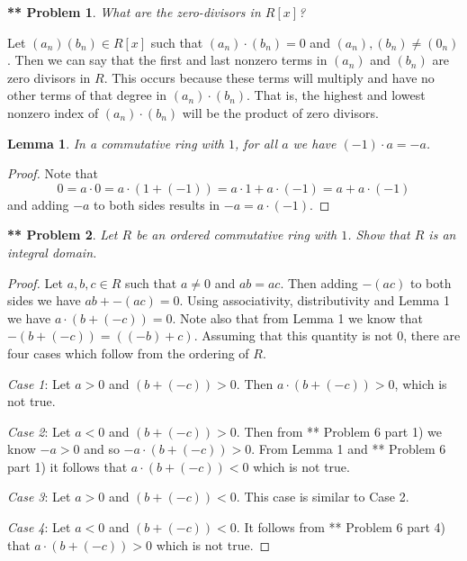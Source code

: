 \documentclass{article}
\newtheorem{lemma}{Lemma}
\newtheorem{**}{** Problem}
\begin{document}
\begin{flushleft}
\begin{**}
What are the zero-divisors in $R[x]$?
\end{**}

Let $(a_n) (b_n) \in R[x]$ such that $(a_n) \cdot (b_n) = 0$ and $(a_n), (b_n) \neq (0_n)$. Then we can say that the first and last nonzero terms in $(a_n)$ and $(b_n)$ are zero divisors in $R$. This occurs because these terms will multiply and have no other terms of that degree in $(a_n) \cdot (b_n)$. That is, the highest and lowest nonzero index of $(a_n) \cdot (b_n)$ will be the product of zero divisors.

\begin{lemma}
In a commutative ring with $1$, for all $a$ we have $(-1) \cdot a = -a$.
\end{lemma}
\begin{proof}
Note that
\[
0 = a \cdot 0 = a \cdot (1 + (-1)) = a \cdot 1 + a \cdot (-1) = a + a \cdot (-1)
\]
and adding $-a$ to both sides results in $-a = a \cdot (-1)$.
\end{proof}

\begin{**}
Let $R$ be an ordered commutative ring with $1$. Show that $R$ is an integral domain.
\end{**}
\begin{proof}
Let $a,b,c \in R$ such that $a \neq 0$ and $ab = ac$. Then adding $-(ac)$ to both sides we have $ab + -(ac) = 0$. Using associativity, distributivity and Lemma 1 we have $a \cdot (b + (-c)) = 0$. Note also that from Lemma 1 we know that $-(b + (-c)) = ((-b) + c)$. Assuming that this quantity is not $0$, there are four cases which follow from the ordering of $R$.\newline

\textit{Case 1}: Let $a > 0$ and $(b + (-c)) > 0$. Then $a \cdot (b + (-c)) > 0$, which is not true.\newline

\textit{Case 2}: Let $a < 0$ and $(b + (-c)) > 0$. Then from ** Problem 6 part 1) we know $-a > 0$ and so $-a \cdot (b + (-c)) > 0$. From Lemma 1 and ** Problem 6 part 1) it follows that $a \cdot (b + (-c)) < 0$ which is not true.\newline

\textit{Case 3}: Let $a > 0$ and $(b + (-c)) < 0$. This case is similar to Case 2.\newline

\textit{Case 4}: Let $a < 0$ and $(b + (-c)) < 0$. It follows from ** Problem 6 part 4) that $a \cdot (b + (-c)) > 0$ which is not true.\newline


\end{proof}
\end{flushleft}
\end{document}
